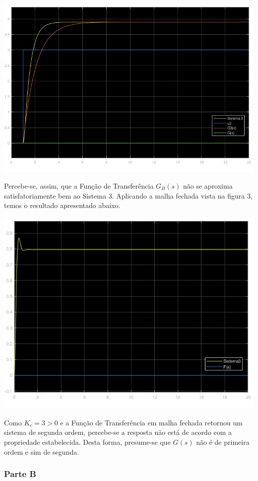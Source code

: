 \documentclass[
]{book}
\begin{document}
\includegraphics{Imagens/Lab3/Resolução/prob3AB.jpg}

Percebe-se, assim, que a Função de Transferência \(G_B(s)\) não se aproxima satisfatoriamente bem ao Sistema 3. Aplicando a malha fechada vista na figura 3, temos o resultado apresentado abaixo.

\includegraphics{Imagens/Lab3/Resolução/prob3AC.jpg}

Como \(K_c = 3 > 0\) e a Função de Transferência em malha fechada retornou um sistema de segunda ordem, percebe-se a resposta não está de acordo com a propriedade estabelecida. Desta forma, presume-se que \(G(s)\) não é de primeira ordem e sim de segunda.

\hypertarget{parte-b}{%
\subsubsection*{Parte B}\label{parte-b}}
\end{document}
